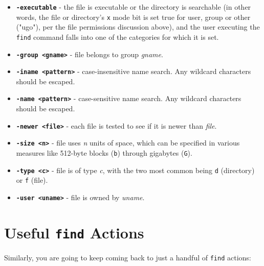\documentclass[10pt,]{book}
\numberwithin{figure}{chapter}
\begin{document}
\begin{itemize}
\item
  \textbf{\texttt{-executable}} - the file is executable or the
  directory is searchable (in other words, the file or directory's
  \texttt{x} mode bit is set true for user, group or other ("ugo"), per
  the file permissions discussion above), and the user executing the
  \texttt{find} command falls into one of the categories for which it is
  set.
\item
  \textbf{\texttt{-group \textless{}gname\textgreater{}}} - file belongs
  to group \emph{gname}.
\item
  \textbf{\texttt{-iname \textless{}pattern\textgreater{}}} -
  case-insensitive name search. Any wildcard characters should be
  escaped.
\item
  \textbf{\texttt{-name \textless{}pattern\textgreater{}}} -
  case-sensitive name search. Any wildcard characters should be escaped.
\item
  \textbf{\texttt{-newer \textless{}file\textgreater{}}} - each file is
  tested to see if it is newer than \emph{file}.
\item
  \textbf{\texttt{-size \textless{}n\textgreater{}}} - file uses
  \emph{n} units of space, which can be specified in various measures
  like 512-byte blocks (\texttt{b}) through gigabytes (\texttt{G}).
\item
  \textbf{\texttt{-type \textless{}c\textgreater{}}} - file is of type
  \emph{c}, with the two most common being \texttt{d} (directory) or
  \texttt{f} (file).
\item
  \textbf{\texttt{-user \textless{}uname\textgreater{}}} - file is owned
  by \emph{uname}.
\end{itemize}

\section*{Useful \texttt{find} Actions}\label{useful-find-actions}

Similarly, you are going to keep coming back to just a handful of
\texttt{find} actions:
\end{document}
